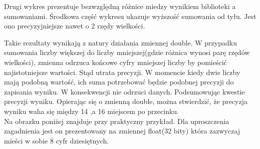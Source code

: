 \documentclass[10pt]{article}
\begin{document}
Drugi wykres prezentuje bezwzględną różnice miedzy wynikiem biblioteki a sumowaniami. 
Środkowa część wykresu ukazuje wyższość sumowania od tyłu. Jest ono precyzyjniejsze nawet o 2 rzędy wielkości.


\begin{center}
\end{center}

Takie rezultaty wynikają z natury działania zmiennej double. W przypadku sumowania liczby większej do liczby mniejszej(gdzie różnica wynosi parę rzędów wielkości), zmienna odrzuca końcowe cyfry mniejszej liczby by pomieścić 
najistotniejsze wartości. Stąd utrata precyzji. W momencie kiedy dwie liczby mają podobną wartość, ich suma potrzebować będzie podobnej precyzji do zapisania wyniku. W konsekwencji nie odrzuci danych. Podsumowując kwestie precyzji wyniku. Opierając się o zmienną double, można stwierdzić, że precyzja wyniku waha się między  14 ,a 16 miejscem po przecinku.\\
Na obrazku poniżej znajduje przy praktyczny przykład. Dla uproszczenia zagadnienia jest on prezentowany na zmiennej float(32 bity) która zazwyczaj mieści w sobie 8 cyfr dziesiętnych.
\end{document}
